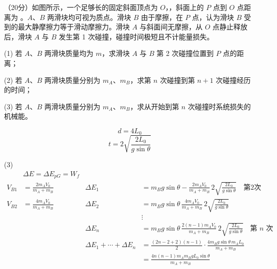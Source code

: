 \begin{problem}
（20分）如图所示，一个足够长的固定斜面顶点为 $O$，，斜面上的 $P$ 点到 $O$ 点距离为 。$A$、$B$ 两滑块均可视为质点。滑块 $B$ 由于摩擦，在 $P$ 点，认为滑块 $B$ 受到的最大静摩擦力等于滑动摩擦力。滑块 $A$ 与斜面间无摩擦，从 $O$ 点静止释放后，滑块 $A$ 与 $B$ 发生第 1 次碰撞，碰撞时间极短且不计能量损失。

(1) 若 $A$、$B$ 两滑块质量均为 $m$，求滑块 $A$ 与 $B$ 第 2 次碰撞位置到 $P$ 点的距离；

(2) 若 $A$、$B$ 两滑块质量分别为 $m_A$、$m_B$，求第 $n$ 次碰撞到第 $n+1$ 次碰撞经历的时间；

(3) 若 $A$、$B$ 两滑块质量分别为 $m_A$、$m_B$，求从开始到第 $n$ 次碰撞时系统损失的机械能。

\begin{solution}
\[ d=4L_0 \]
\[ t=2\sqrt{\frac{2L_0}{g\sin\theta}} \]


(3)
\begin{align*}
&\Delta E=\Delta E_{pG}=W_f\\
V_{B1}&=\frac{2m_AV_0}{m_A+m_B} & \Delta E_1&=m_Bg\sin\theta-\frac{2m_AV_0}{m_A+m_B}\,2\sqrt{\frac{2L_0}{g\sin\theta}}\quad\text{第2次}\\
V_{B2}&=\frac{4m_AV_0}{m_A+m_B} & \Delta E_2&=m_Bg\sin\theta\,\frac{4m_AV_0}{m_A+m_B}\,2\sqrt{\frac{2L_0}{g\sin\theta}}\\
&&&\vdots\\
&& \Delta E_n&=m_Bg\sin\theta\,\frac{2(n-1)m_AV_0}{m_A+m_B}\,2\sqrt{\frac{2L_0}{g\sin\theta}}\quad\text{第 $n$ 次}\\
&& \Delta E_1+\cdots+\Delta E_n&=\frac{(2n-2+2)(n-1)}{2}\cdot\frac{4m_Bg\sin\theta\,m_AL_0}{m_A+m_B}\\
&&&=\frac{4n(n-1)m_Am_BgL_0\sin\theta}{m_A+m_B}
\end{align*}

\end{solution}
\end{problem}

